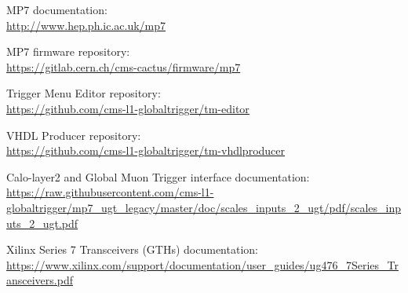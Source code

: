 \documentclass[11pt,a4paper,english,titlepage]{article}
\begin{document}
    \doctitlepage{}

    

    \doctoc{}

    
    
    
    
    
    
    
    

    \doctables{}

    \docfigures{}


    \clearpage

    \begin{thebibliography}{00}

    MP7 documentation:\\
    \url{http://www.hep.ph.ic.ac.uk/mp7}

    MP7 firmware repository:\\
    \url{https://gitlab.cern.ch/cms-cactus/firmware/mp7}

    Trigger Menu Editor repository:\\
    \url{https://github.com/cms-l1-globaltrigger/tm-editor}

    VHDL Producer repository:\\
    \url{https://github.com/cms-l1-globaltrigger/tm-vhdlproducer}

    Calo-layer2 and Global Muon Trigger interface documentation:\\
    \url{https://raw.githubusercontent.com/cms-l1-globaltrigger/mp7_ugt_legacy/master/doc/scales_inputs_2_ugt/pdf/scales_inputs_2_ugt.pdf}

    Xilinx Series 7 Transceivers (GTHs) documentation:\\
    \url{https://www.xilinx.com/support/documentation/user_guides/ug476_7Series_Transceivers.pdf}


    \end{thebibliography}

\end{document}
